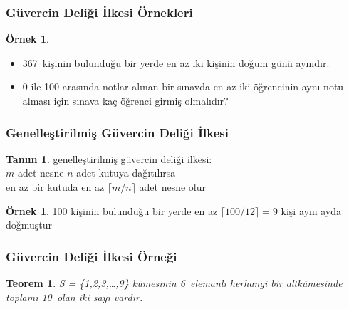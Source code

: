 \documentclass[dvipsnames]{beamer}
\theoremstyle{definition}
\newtheorem{tanim}[theorem]{Tanım}
\theoremstyle{example}
\newtheorem{ornek}[theorem]{Örnek}
\theoremstyle{plain}
\newtheorem{teorem}[theorem]{Teorem}
\begin{document}
\begin{frame}
  \frametitle{Güvercin Deliği İlkesi Örnekleri}

  \begin{ornek}
    \begin{itemize}
      \item 367~kişinin bulunduğu bir yerde en az iki kişinin doğum günü
        aynıdır.

      \pause
      \item 0 ile 100 arasında notlar alınan bir sınavda en az iki öğrencinin
        aynı notu alması için sınava kaç öğrenci girmiş olmalıdır?
    \end{itemize}
  \end{ornek}
\end{frame}

\begin{frame}
  \frametitle{Genelleştirilmiş Güvercin Deliği İlkesi}

  \begin{tanim}
    \alert{genelleştirilmiş güvercin deliği ilkesi}:\\
    $m$ adet nesne $n$ adet kutuya dağıtılırsa\\
    en az bir kutuda en az $\lceil m / n \rceil$ adet nesne olur
  \end{tanim}

  \pause
  \begin{ornek}
    100 kişinin bulunduğu bir yerde en az $\lceil 100 / 12 \rceil = 9$ kişi
    aynı ayda doğmuştur
  \end{ornek}
\end{frame}

\begin{frame}
  \frametitle{Güvercin Deliği İlkesi Örneği}

  \begin{teorem}
    S = \{1,2,3,\dots,9\} kümesinin 6~elemanlı herhangi bir altkümesinde
    toplamı 10~olan iki sayı vardır.
  \end{teorem}
\end{frame}
\end{document}
